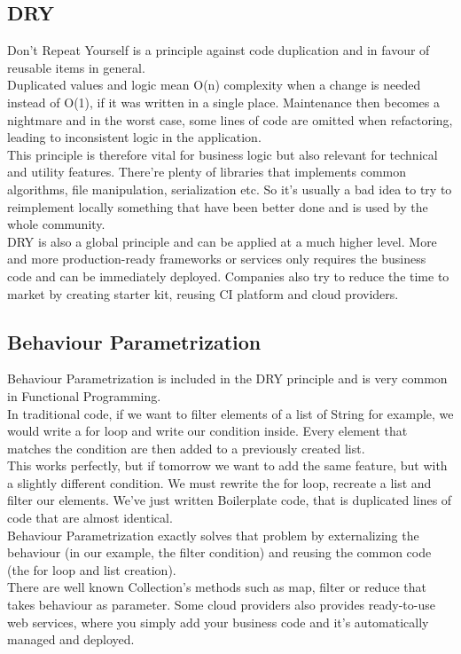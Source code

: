 \subsection{DRY}\label{subsec:dry}
Don't Repeat Yourself is a principle against code duplication and in
favour of reusable items in general. \\
\newline
Duplicated values and logic mean O(n) complexity when a change is needed
instead of O(1), if it was written in a single place.
Maintenance then becomes a nightmare and in the worst case, some lines of
code are omitted when refactoring, leading to inconsistent logic in the
application. \\
\newline
This principle is therefore vital for business logic but also relevant
for technical and utility features.
There're plenty of libraries that implements common algorithms, file
manipulation, serialization etc.
So it's usually a bad idea to try to reimplement locally something that
have been better done and is used by the whole community. \\
\newline
DRY is also a global principle and can be applied at a much higher level.
More and more production-ready frameworks or services only requires
the business code and can be immediately deployed.
Companies also try to reduce the time to market by creating starter kit,
reusing CI platform and cloud providers.

\subsection{Behaviour Parametrization}
\label{subsec:behaviour-parametrization}
Behaviour Parametrization is included in the DRY principle and is very
common in Functional Programming. \\
\newline
In traditional code, if we want to filter elements of a list of String
for example, we would write a for loop and write our condition inside.
Every element that matches the condition are then added to a previously
created list. \\
This works perfectly, but if tomorrow we want to add the same feature,
but with a slightly different condition.
We must rewrite the for loop, recreate a list and filter our elements.
We've just written Boilerplate code, that is duplicated lines of code
that are almost identical. \\
\newline
Behaviour Parametrization exactly solves that problem by externalizing
the behaviour (in our example, the filter condition) and reusing the
common code (the for loop and list creation). \\
There are well known Collection's methods such as map, filter or reduce
that takes behaviour as parameter.
Some cloud providers also provides ready-to-use web services,
where you simply add your business code and it's automatically managed
and deployed.

